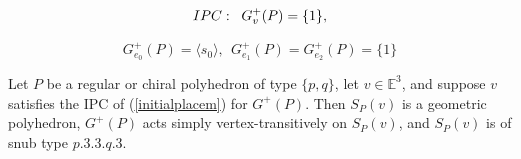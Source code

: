 \documentclass[10pt,a4paper]{amsart}
\begin{document}
\begin{equation}
\label{initialplacem}
{\rm IPC:}\;\;\; G_v^+(P)=\{1\},
\end{equation}

\begin{equation}
\label{stabei}
G^{+}_{e_0}(P) = \langle s_0 \rangle,\;\, G^{+}_{e_1}(P) = G^{+}_{e_2}(P) = \{1\} 
\end{equation}

\begin{theorem}
\label{thm1}
Let $P$ be a regular or chiral polyhedron of type $\{p,q\}$, let $v\in \mathbb{E}^3$, and suppose $v$ satisfies the IPC of (\ref{initialplacem}) for $G^+(P)$. Then $S_{P}(v)$ is a geometric polyhedron, $G^{+}(P)$ acts simply vertex-transitively on $S_{P}(v)$, and $S_{P}(v)$ is of snub type $p.3.3.q.3$. 
\end{theorem}
\end{document}
